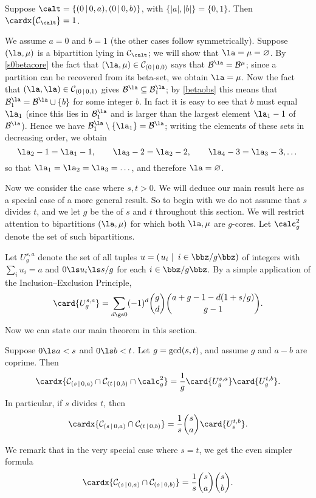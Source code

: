 \documentclass[a4paper, 11pt, twoside]{article}
\begin{document}
\begin{propn}\label{s0t0}
Suppose $\calt=\{(0\,|\,0,a),(0\,|\,0,b)\}$, with $\{|a|,|b|\}=\{0,1\}$. Then $\cardx{\smc\calt}=1$.
\end{propn}

\begin{pf}
We assume $a=0$ and $b=1$ (the other cases follow symmetrically). Suppose $(\la,\mu)$ is a bipartition lying in $\smc\calt$; we will show that $\la=\mu=\varnothing$. By \ref{s0betacore} the fact that $(\la,\mu)\in\mc0{0,0}$ says that $\be\la=\be\mu$; since a partition can be recovered from its beta-set, we obtain $\la=\mu$. Now the fact that $(\la,\la)\in\mc0{0,1}$ gives $\be\la\subseteq\ber\la1$; by \cref{betaobs} this means that $\ber\la1=\be\la\cup\{b\}$ for some integer $b$. In fact it is easy to see that $b$ must equal $\la_1$ (since this lies in $\ber\la1$ and is larger than the largest element $\la_1-1$ of $\be\la$). Hence we have $\ber\la1\setminus\{\la_1\}=\be\la$; writing the elements of these sets in decreasing order, we obtain
\[
\la_2-1=\la_1-1,\qquad\la_3-2=\la_2-2,\qquad\la_4-3=\la_3-3,\dots
\]
so that $\la_1=\la_2=\la_3=\dots$, and therefore $\la=\varnothing$.
\end{pf}

Now we consider the case where $s,t>0$. We will deduce our main result here as a special case of a more general result. So to begin with we do not assume that $s$ divides $t$, and we let $g$ be the \gcd of $s$ and $t$ throughout this section. We will restrict attention to bipartitions $(\la,\mu)$ for which both $\la,\mu$ are $g$-cores. Let $\cores g^2$ denote the set of such bipartitions.

Let $U_g^{s,a}$ denote the set of all tuples $u=\ltup{u_i}{i\in\zgz}$ of integers with $\sum_i u_i=a$ and $0\ls u_i\ls s/g$ for each $i\in\zgz$. By a simple application of the Inclusion--Exclusion Principle,
\[
\card{U_g^{s,a}}=\sum_{d\gs0}(-1)^d\binom gd\binom{a+g-1-d(1+s/g)}{g-1}.
\]
Now we can state our main theorem in this section.

\begin{thm}\label{countss}
Suppose $0\ls a<s$ and $0\ls b<t$. Let $g=\operatorname{gcd}(s,t)$, and assume $g$ and $a-b$ are coprime. Then
\[
\cardx{\bc sa\cap\bc tb\cap\smash{\cores g^2}}=\frac1g\card{U_g^{s,a}}\card{U_g^{t,b}}.
\]
In particular, if $s$ divides $t$, then
\[
\cardx{\bc sa\cap\bc tb}=\frac1s\binom sa\card{U_s^{t,b}}.
\]
\end{thm}

We remark that in the very special case where $s=t$, we get the even simpler formula
\[
\cardx{\bc sa\cap\bc sb}=\frac1s\binom sa\binom sb.
\]
\end{document}
